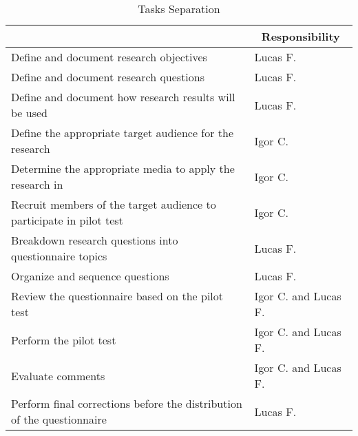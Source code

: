 \begin{table}
  \centering
  \caption{Tasks Separation}
  \label{tbl:survey-tasks}
  \footnotesize
  \begin{tabular}{l|l}
    \bottomrule
    \rowcolor[rgb]{0.753,0.753,0.753} \multicolumn{1}{c|}{\textbf{Activity}}                             & \multicolumn{1}{c}{\textbf{Responsibility}} \\
    \hline
    \rowcolor[rgb]{0.898,0.898,0.898} Define and document research objectives                            & Lucas F.                                    \\
    Define and document research questions                                                               & Lucas F.                                    \\
    \rowcolor[rgb]{0.898,0.898,0.898} Define and document how research results will be used              & Lucas F.                                    \\
    Define the appropriate target audience for the research                                              & Igor C.                                     \\
    \rowcolor[rgb]{0.898,0.898,0.898} Determine the appropriate media to apply the research in           & Igor C.                                     \\
    Recruit members of the target audience to participate in pilot test                                  & Igor C.                                     \\
    \rowcolor[rgb]{0.898,0.898,0.898} Breakdown research questions into questionnaire topics             & Lucas F.                                    \\
    Organize and sequence questions                                                                      & Lucas F.                                    \\
    \rowcolor[rgb]{0.898,0.898,0.898} Review the questionnaire based on the pilot test                   & Igor C. and Lucas F.                        \\
    Perform the pilot test                                                                               & Igor C. and Lucas F.                        \\
    \rowcolor[rgb]{0.898,0.898,0.898} Evaluate comments                                                  & Igor C. and Lucas F.                        \\
    Perform final corrections before the distribution of the questionnaire                               & Lucas F.                                    \\

\end{tabular}
\end{table}
